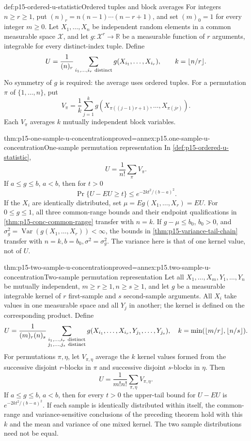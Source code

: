 \begin{hbdefinition}{def:p15-ordered-u-statistic}{Ordered tuples and block averages}
For integers \(n\geq r\geq1\), put
\((n)_r=n(n-1)\cdots(n-r+1)\), and set \((m)_0=1\) for every integer
\(m\geq0\). Let \(X_1,\ldots,X_n\) be independent
random elements in a common measurable space \(\mathcal X\), and let
\(g:\mathcal X^r\to\mathbb R\) be a measurable function of \(r\)
arguments, integrable for every distinct-index tuple. Define
\[
 U=\frac1{(n)_r}\sum_{i_1,\ldots,i_r\ {\rm distinct}}
                   g(X_{i_1},\ldots,X_{i_r}),\qquad k=\lfloor n/r\rfloor.
\]
No symmetry of \(g\) is required: the average uses ordered tuples.
For a permutation \(\pi\) of \(\{1,\ldots,n\}\), put
\[
 V_\pi=\frac1k\sum_{j=1}^k
 g(X_{\pi((j-1)r+1)},\ldots,X_{\pi(jr)}).
\]
Each \(V_\pi\) averages \(k\) mutually independent block variables.
\end{hbdefinition}

\begin{hbtheorem}{thm:p15-one-sample-u-concentration}{proved=annex:p15.one-sample-u-concentration}{One-sample permutation representation}
In \cref{def:p15-ordered-u-statistic},
\[
 U=\frac1{n!}\sum_\pi V_\pi.
\]
If \(a\leq g\leq b\), \(a<b\), then for \(t>0\)
\[
 \Pr\{U-EU\geq t\}\leq e^{-2kt^2/(b-a)^2}.
\]
If the \(X_i\) are identically distributed, set
\(\mu=Eg(X_1,\ldots,X_r)=EU\).
For \(0\leq g\leq1\), all three common-range bounds and their endpoint
qualifications in \cref{thm:p15-conc-common-range} transfer with \(n=k\).
If \(g-\mu\leq b_0\), \(b_0>0\), and
\(\sigma_g^2=\operatorname{Var}(g(X_1,\ldots,X_r))<\infty\), the bounds
in \cref{thm:p15-variance-tail-chain} transfer with
\(n=k,b=b_0,\sigma^2=\sigma_g^2\).
The variance here is that of one kernel value, not of \(U\).
\end{hbtheorem}

\begin{hbtheorem}{thm:p15-two-sample-u-concentration}{proved=annex:p15.two-sample-u-concentration}{Two-sample permutation representation}
Let all \(X_1,\ldots,X_m,Y_1,\ldots,Y_n\) be mutually independent,
\(m\geq r\geq1,n\geq s\geq1\), and let \(g\) be a measurable integrable
kernel of \(r\) first-sample and \(s\) second-sample arguments.
All \(X_i\) take values in one measurable space and all \(Y_j\) in
another; the kernel is defined on the corresponding product. Define
\[
 U=\frac1{(m)_r(n)_s}
 \sum_{\substack{i_1,\ldots,i_r\ {\rm distinct}\\
                 j_1,\ldots,j_s\ {\rm distinct}}}
 g(X_{i_1},\ldots,X_{i_r},Y_{j_1},\ldots,Y_{j_s}),\quad
 k=\min(\lfloor m/r\rfloor,\lfloor n/s\rfloor).
\]
For permutations \(\pi,\eta\), let \(V_{\pi,\eta}\) average the \(k\)
kernel values formed from the successive disjoint \(r\)-blocks in
\(\pi\) and successive disjoint \(s\)-blocks in \(\eta\). Then
\[
 U=\frac1{m!n!}\sum_{\pi,\eta}V_{\pi,\eta}.
\]
If \(a\leq g\leq b\), \(a<b\), then for every \(t>0\) the upper-tail
bound for \(U-EU\) is \(e^{-2kt^2/(b-a)^2}\).
If each sample is identically distributed within itself, the common-range
and variance-sensitive conclusions of the preceding theorem hold with
this \(k\) and the mean and variance of one mixed kernel.
The two sample distributions need not be equal.
\end{hbtheorem}

